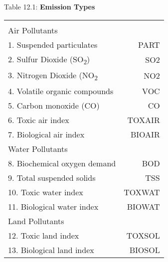 \documentclass[12pt]{article}
\begin{document}
\newpage
\begin{center}
\begin{large}
{\centering Table 12.1: \textbf{Emission Types} \par}


\begin{tabular}{l r}
\hline\\[5pt]


Air Pollutants\\
1. \hspace{10pt} Suspended particulates & PART\\
2. \hspace{10pt} Sulfur Dioxide (SO\textsubscript{2}) & SO2\\
3. \hspace{10pt} Nitrogen Dioxide (NO\textsubscript{2} & NO2\\
4. \hspace{10pt} Volatile organic compounds & VOC\\
5. \hspace{10pt} Carbon monoxide (CO) & CO\\
6. \hspace{10pt} Toxic air index & TOXAIR\\
7. \hspace{10pt} Biological air index & BIOAIR\\[15pt]

Water Pollutants\\
8. \hspace{10pt} Biochemical oxygen demand & BOD\\
9. \hspace{10pt} Total suspended solids & TSS\\
10. \hspace{10pt} Toxic water index & TOXWAT\\
11. \hspace{10pt} Biological water index & BIOWAT\\[15pt]

Land Pollutants\\
12. \hspace{10pt} Toxic land index & TOXSOL\\
13. \hspace{10pt} Biological land index & BIOSOL\\[20pt]

\hline
\end{tabular}
\end{large}
\end{center}
\end{document}
